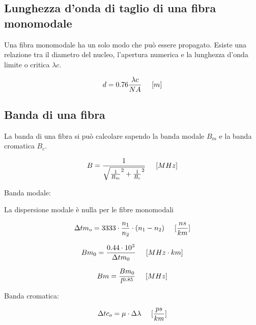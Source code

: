 \documentclass{article}
\begin{document}
    \subsection{Lunghezza d'onda di taglio di una fibra monomodale}

    Una fibra monomodale ha un solo modo che può essere propagato. Esiste una relazione tra il diametro del nucleo, l'apertura
    numerica e la lunghezza d'onda limite o critica $\lambda c$.

    \begin{equation}
        d = 0.76 \frac{\lambda c}{NA} \hspace{0.5cm} [m]
    \end{equation}

    \subsection{Banda di una fibra}

    La banda di una fibra si può calcolare sapendo la banda modale $B_m$ e la banda cromatica $B_c$.

    \begin{equation}
        B = \frac{1}{
            \sqrt{
                \frac{1}{B_m}^2 +
                \frac{1}{B_c}^2
            }
        } \hspace{0.5cm} [MHz]
    \end{equation}

    Banda modale:

    La dispersione modale è nulla per le fibre monomodali    

    \begin{equation}
        \Delta tm_o = 3333 \cdot \frac{n_1}{n_2} \cdot (n_1 - n_2) \hspace{0.5cm} [\frac{ns}{km}]
    \end{equation}

    \begin{equation}
        Bm_0 = \frac{0.44 \cdot 10^3}{\Delta tm_0} \hspace{0.5cm} [MHz \cdot km]
    \end{equation}

    \begin{equation}
        Bm = \frac{Bm_0}{l^{0.85}} \hspace{0.5cm} [MHz]
    \end{equation}
    
    Banda cromatica:

    \begin{equation}
        \Delta tc_o = \mu \cdot \Delta \lambda \hspace{0.5cm} [\frac{ps}{km}]
    \end{equation}
\end{document}
